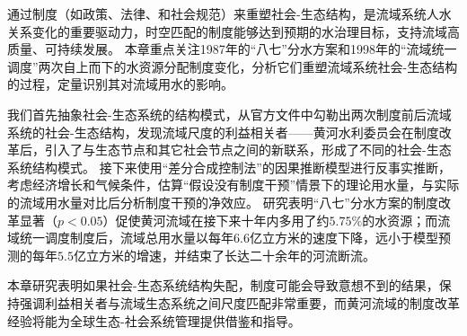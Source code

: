 通过制度（如政策、法律、和社会规范）来重塑社会-生态结构，是流域系统人水关系变化的重要驱动力，时空匹配的制度能够达到预期的水治理目标，支持流域高质量、可持续发展。
本章重点关注1987年的“八七”分水方案和1998年的“流域统一调度”两次自上而下的水资源分配制度变化，分析它们重塑流域系统社会-生态结构的过程，定量识别其对流域用水的影响。

我们首先抽象社会-生态系统的结构模式，从官方文件中勾勒出两次制度前后流域系统的社会-生态结构，发现流域尺度的利益相关者——黄河水利委员会在制度改革后，引入了与生态节点和其它社会节点之间的新联系，形成了不同的社会-生态系统结构模式。
接下来使用“差分合成控制法”的因果推断模型进行反事实推断，考虑经济增长和气候条件，估算“假设没有制度干预”情景下的理论用水量，与实际的流域用水量对比后分析制度干预的净效应。
研究表明“八七”分水方案的制度改革显著（$p<0.05$）促使黄河流域在接下来十年内多用了约$5.75\%$的水资源；而流域统一调度制度后，流域总用水量以每年$6.6$亿立方米的速度下降，远小于模型预测的每年$5.5$亿立方米的增速，并结束了长达二十余年的河流断流。

本章研究表明如果社会-生态系统结构失配，制度可能会导致意想不到的结果，保持强调利益相关者与流域生态系统之间尺度匹配非常重要，而黄河流域的制度改革经验将能为全球生态-社会系统管理提供借鉴和指导。
